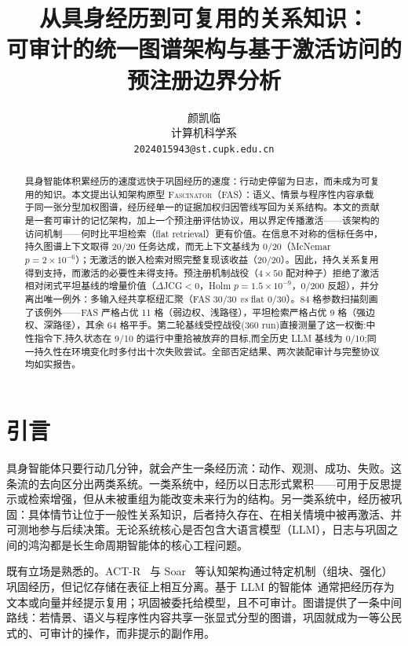 \documentclass[10pt,a4paper]{ctexart}
\title{\bfseries 从具身经历到可复用的关系知识：\\
可审计的统一图谱架构与基于激活访问的\\
预注册边界分析}
\author{颜凯临\\ \small 计算机科学系\\ \small \texttt{2024015943@st.cupk.edu.cn}}
\date{}
\begin{document}
\maketitle

\begin{abstract}
具身智能体积累经历的速度远快于巩固经历的速度：行动史停留为日志，而未成为可复用的知识。本文提出认知架构原型 \textsc{Fascinator}（FAS）：语义、情景与程序性内容承载于同一张分型加权图谱，经历经单一的证据加权归因管线写回为关系结构。本文的贡献是一套可审计的记忆架构，加上一个预注册评估协议，用以界定传播激活——该架构的访问机制——何时比平坦检索（flat retrieval）更有价值。在信息不对称的信标任务中，持久图谱上下文取得 20/20 任务达成，而无上下文基线为 0/20（McNemar $p{=}2\times10^{-6}$）；无激活的嵌入检索对照完整复现该收益（20/20）。因此，持久关系复用得到支持，而激活的必要性未得支持。预注册机制战役（$4\times50$ 配对种子）拒绝了激活相对闭式平坦基线的增量价值（$\Delta$JCG${<}0$，Holm $p{=}1.5\times10^{-9}$，0/200 反超），并分离出唯一例外：多输入经共享枢纽汇聚（FAS 30/30 \emph{vs} flat 0/30）。84 格参数扫描刻画了该例外——FAS 严格占优 11 格（弱边权、浅路径），平坦检索严格占优 9 格（强边权、深路径），其余 64 格平手。第二轮基线受控战役(360 run)直接测量了这一权衡:中性指令下,持久状态在 9/10 的运行中重拾被放弃的目标,而全历史 LLM 基线为 0/10;同一持久性在环境变化时多付出十次失败尝试。全部否定结果、两次装配审计与完整协议均如实报告。
\end{abstract}

\section{引言}
\label{sec:intro}

具身智能体只要行动几分钟，就会产生一条经历流：动作、观测、成功、失败。这条流的去向区分出两类系统。一类系统中，经历以日志形式累积——可用于反思提示或检索增强，但从未被重组为能改变未来行为的结构。另一类系统中，经历被巩固：具体情节让位于一般性关系知识，后者持久存在、在相关情境中被再激活、并可测地参与后续决策。无论系统核心是否包含大语言模型（LLM），日志与巩固之间的鸿沟都是长生命周期智能体的核心工程问题。

既有立场是熟悉的。ACT-R~\citep{anderson2004integrated} 与 Soar~\citep{laird2012soar} 等认知架构通过特定机制（组块、强化）巩固经历，但记忆存储在表征上相互分离。基于 LLM 的智能体~\citep{yao2023react,park2023generative,shinn2023reflexion}通常把经历存为文本或向量并经提示复用；巩固被委托给模型，且不可审计。图谱提供了一条中间路线：若情景、语义与程序性内容共享一张显式分型的图谱，巩固就成为一等公民式的、可审计的操作，而非提示的副作用。
\end{document}
